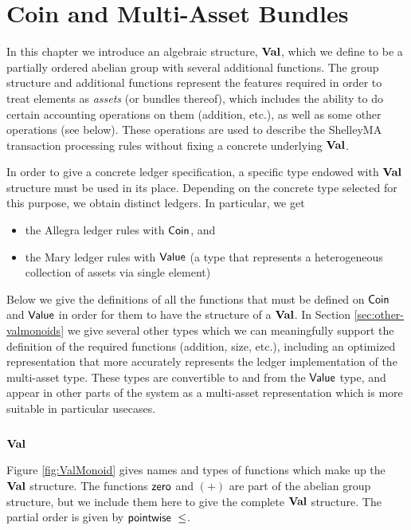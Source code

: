 \section{Coin and Multi-Asset Bundles}
\label{sec:coin-ma}

In this chapter we introduce an algebraic structure, $\mathbf{Val}$,
which we define to be a partially ordered abelian group with several additional functions.
The group structure and additional functions represent the
features required in order to treat elements as \emph{assets} (or bundles thereof),
which includes the ability to do certain accounting operations on them (addition, etc.),
as well as some other operations (see below).
These operations are used to describe the ShelleyMA transaction processing rules
without fixing a concrete underlying $\mathbf{Val}$.

In order to give a concrete ledger specification, a specific type
endowed with $\mathbf{Val}$ structure must be used in its place.
Depending on the concrete type selected for this purpose,
we obtain distinct ledgers. In particular, we get

\begin{itemize}
  \item the Allegra ledger rules with $\mathsf{Coin}$, and
  \item the Mary ledger rules with $\mathsf{Value}$ (a type that represents a heterogeneous collection of assets via
  single element)
\end{itemize}

Below we give the definitions of all the functions that must be defined on
$\mathsf{Coin}$ and $\mathsf{Value}$ in order for them to have the structure of a $\mathbf{Val}$.
In Section \ref{sec:other-valmonoids} we give several other types which we can meaningfully
support the definition of the required functions (addition, size, etc.), including
an optimized representation that more accurately represents the ledger implementation
of the multi-asset type.
These types are convertible to and from the $\mathsf{Value}$ type, and appear in other
parts of the system as a multi-asset representation which is more suitable in particular
usecases.

\subsection{$\mathbf{Val}$}

Figure \ref{fig:ValMonoid} gives names and types of functions which
make up the $\mathbf{Val}$ structure. The functions $\mathsf{zero}$ and $(+)$ are
part of the abelian group structure, but we include them here to give the
complete $\mathbf{Val}$ structure. The partial order is given by $\mathsf{pointwise}~\leq$.

